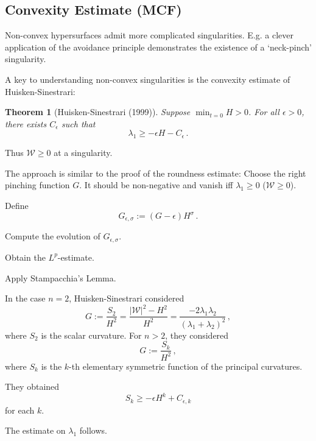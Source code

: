 \documentclass[12pt,ignorenonframes]{beamer}
\theoremstyle{plain}
\numberwithin{equation}{section}
\newtheorem{thm}{Theorem}[section]
\theoremstyle{remark}
\newcommand{\W}{\mathcal{W}}
\newcommand{\cd}{\nabla}
\newcommand{\pd}{\partial}
\newcommand{\Ges}{G_{\epsilon,\sigma}}
\def\bann #1\eann {\begin{align*} #1\end{align*}}
\def\bi #1\ei {\begin{itemize} #1\end{itemize}}
\def\bf #1\ef {\begin{frame}<presentation> #1\end{frame}}
\begin{document}
\subsection{Convexity Estimate (MCF)}

\bf{Convexity estimate (MCF)}
Non-convex hypersurfaces admit more complicated singularities. 
\bi
\item E.g. a clever application of the avoidance principle demonstrates the existence of a `neck-pinch' singularity. 
\item A key to understanding non-convex singularities is the convexity estimate of Huisken-Sinestrari:
\begin{thm}[Huisken-Sinestrari (1999)]
Suppose $\min_{t=0}H>0$. For all $\epsilon>0$, there exists $C_\epsilon$ such that \vspace{-4mm}
$$
\lambda_1\geq -\epsilon H-C_\epsilon\,.
$$
\end{thm}
\item Thus $\W\geq 0$ at a singularity.
\ei
\ef

\bf{Proving the Convexity Estimate (MCF)}
The approach is similar to the proof of the roundness estimate:
\bi
\item Choose the right pinching function $G$. It should be non-negative and vanish iff $\lambda_1\geq 0$ ($\W\geq 0$).
\item Define
$$
\Ges:={} \left(G-\epsilon\right)H^\sigma\,.
$$
\item Compute the evolution of $\Ges$.
\item Obtain the $L^p$-estimate.
\item Apply Stampacchia's Lemma.
\ei
\ef

\bf{Proving the Convexity Estimate (MCF)}
In the case $n=2$, Huisken-Sinestrari considered
$$
G:=\frac{S_2}{H^2}=\frac{|\W|^2-H^2}{H^2}=\frac{-2\lambda_1\lambda_2}{(\lambda_1+\lambda_2)^2}\,,
$$
where $S_2$ is the scalar curvature.
\bi
\item For $n>2$, they considered
$$
G:=\frac{S_k}{H^2}\,,
$$
where $S_k$ is the $k$-th elementary symmetric function of the principal curvatures.
\item They obtained
$$
S_k\geq -\epsilon H^k+C_{\epsilon,k}
$$
for each $k$.
\item The estimate on $\lambda_1$ follows.
\ei
\ef

\end{document}
